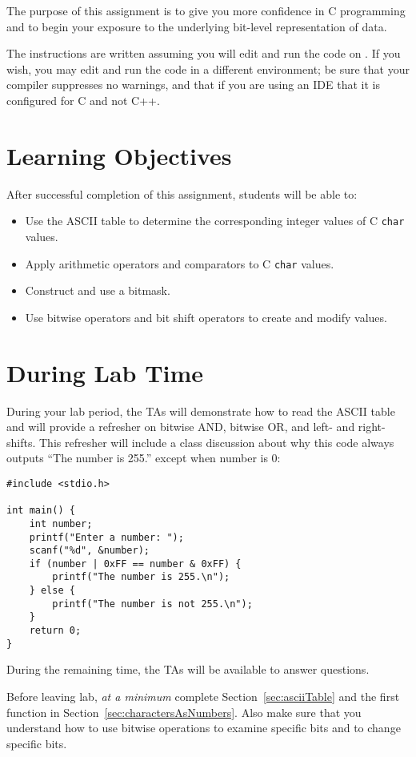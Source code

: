 The purpose of this assignment is to give you more confidence in C programming and to begin your exposure to the underlying bit-level representation of data.

The instructions are written assuming you will edit and run the code on \runtimeenvironment.
If you wish, you may edit and run the code in a different environment;
be sure that your compiler suppresses no warnings, and that if you are using an IDE that it is configured for C and not C++.

\tableofcontents

\section*{Learning Objectives}

After successful completion of this assignment, students will be able to:
\begin{itemize}
    \item Use the ASCII table to determine the corresponding integer values of C \lstinline{char} values.
    \item Apply arithmetic operators and comparators to C \lstinline{char} values.
    \item Construct and use a bitmask.
    \item Use bitwise operators and bit shift operators to create and modify values.
\end{itemize}

\section*{During Lab Time}

During your lab period, the TAs will demonstrate how to read the ASCII table and will provide a refresher on bitwise AND, bitwise OR, and left- and right-shifts.
This refresher will include a class discussion about why this code always outputs ``The number is 255.'' except when number is 0:
\begin{lstlisting}
#include <stdio.h>

int main() {
    int number;
    printf("Enter a number: ");
    scanf("%d", &number);
    if (number | 0xFF == number & 0xFF) {
        printf("The number is 255.\n");
    } else {
        printf("The number is not 255.\n");
    }
    return 0;
}
\end{lstlisting}
During the remaining time, the TAs will be available to answer questions.

Before leaving lab, \textit{at a minimum} complete Section~\ref{sec:asciiTable} and the first function in Section~\ref{sec:charactersAsNumbers}.
Also make sure that you understand how to use bitwise operations to examine specific bits and to change specific bits.
